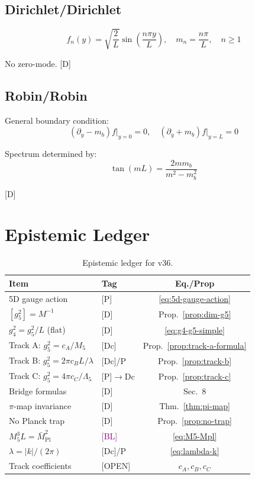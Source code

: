 \documentclass[11pt,a4paper]{article}
\newcommand{\tagD}{\textcolor{blue!70!black}{[D]}}
\newcommand{\tagDc}{\textcolor{blue!50!black}{[Dc]}}
\newcommand{\tagP}{\textcolor{green!50!black}{[P]}}
\newcommand{\tagBL}{\textcolor{purple}{[BL]}}
\newcommand{\tagOPEN}{\textcolor{red!70!black}{[OPEN]}}
\begin{document}
\subsection{Dirichlet/Dirichlet}

\begin{equation}
\label{eq:app-DD}
f_n(y) = \sqrt{\frac{2}{L}} \sin\left(\frac{n\pi y}{L}\right), \quad m_n = \frac{n\pi}{L}, \quad n \geq 1
\end{equation}

No zero-mode. \tagD

\subsection{Robin/Robin}

General boundary condition:
\begin{equation}
\label{eq:app-robin}
(\partial_y - m_b) f\big|_{y=0} = 0, \quad (\partial_y + m_b) f\big|_{y=L} = 0
\end{equation}

Spectrum determined by:
\begin{equation}
\label{eq:app-robin-spectrum}
\tan(m L) = \frac{2 m m_b}{m^2 - m_b^2}
\end{equation}

\tagD

\section{Epistemic Ledger}
\label{app:ledger}

\begin{table}[h]
\centering
\begin{tabular}{llc}
\toprule
Item & Tag & Eq./Prop \\
\midrule
5D gauge action & \tagP & \eqref{eq:5d-gauge-action} \\
$[g_5^2] = M^{-1}$ & \tagD & Prop.~\ref{prop:dim-g5} \\
$g_4^2 = g_5^2/L$ (flat) & \tagD & \eqref{eq:g4-g5-simple} \\
Track A: $g_5^2 = c_A/M_5$ & \tagDc & Prop.~\ref{prop:track-a-formula} \\
Track B: $g_5^2 = 2\pi c_B L/\lambda$ & \tagDc/P & Prop.~\ref{prop:track-b} \\
Track C: $g_5^2 = 4\pi c_C/\Lambda_5$ & \tagP$\to$Dc & Prop.~\ref{prop:track-c} \\
Bridge formulas & \tagD & Sec.~8 \\
$\pi$-map invariance & \tagD & Thm.~\ref{thm:pi-map} \\
No Planck trap & \tagD & Prop.~\ref{prop:no-trap} \\
$M_5^3 L = \bar{M}_{\text{Pl}}^2$ & \tagBL & \eqref{eq:M5-Mpl} \\
$\lambda = |k|/(2\pi)$ & \tagDc/P & \eqref{eq:lambda-k} \\
Track coefficients & \tagOPEN & $c_A, c_B, c_C$ \\
\bottomrule
\end{tabular}
\caption{Epistemic ledger for v36.}
\label{tab:ledger}
\end{table}
\end{document}
